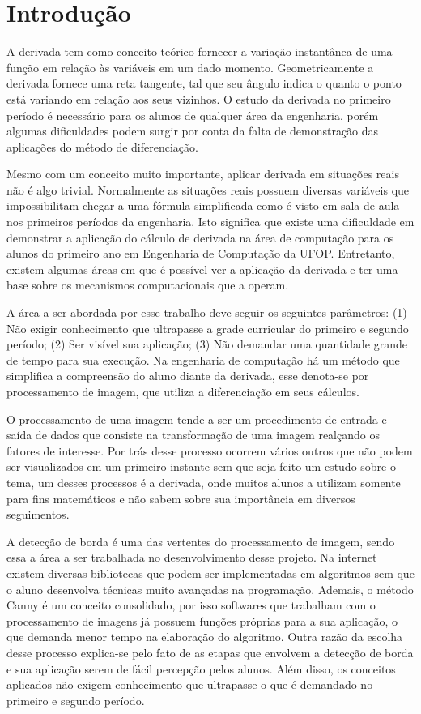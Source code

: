 \documentclass[12pt]{article}
\begin{document}
	
	\section{Introdução}
	
	A derivada tem como conceito teórico fornecer a variação instantânea de uma função em relação às variáveis em um dado momento. Geometricamente a derivada fornece uma reta tangente, tal que seu ângulo indica o quanto o ponto está variando em relação aos seus vizinhos. O estudo da derivada no primeiro período é necessário para os alunos de qualquer área da engenharia, porém algumas dificuldades podem surgir por conta da falta de demonstração das aplicações do método de diferenciação. 
	
	Mesmo com um conceito muito importante, aplicar derivada em situações reais não é algo trivial. Normalmente as situações reais possuem diversas variáveis que impossibilitam chegar a uma fórmula simplificada como é visto em sala de aula nos primeiros períodos da engenharia. Isto significa que existe uma dificuldade em demonstrar a aplicação do cálculo de derivada na área de computação para os alunos do primeiro ano em Engenharia de Computação da UFOP. Entretanto, existem algumas áreas em que é possível ver a aplicação da derivada e ter uma base sobre os mecanismos computacionais que a operam. 
	
	A área a ser abordada por esse trabalho deve seguir os seguintes parâmetros: (1) Não exigir conhecimento que ultrapasse a grade curricular do primeiro e segundo período; (2) Ser visível sua aplicação; (3) Não demandar uma quantidade grande de tempo para sua execução. Na engenharia de computação há um método que simplifica a compreensão do aluno diante da derivada, esse denota-se por processamento de imagem, que utiliza a diferenciação em seus cálculos.
	
	O processamento de uma imagem tende a ser um procedimento de entrada e saída de dados que consiste na transformação de uma imagem realçando os fatores de interesse. Por trás desse processo ocorrem vários outros que não podem ser visualizados em um primeiro instante sem que seja feito um estudo sobre o tema, um desses processos é a derivada, onde muitos alunos a utilizam somente para fins matemáticos e não sabem sobre sua importância em diversos seguimentos.
	
	A detecção de borda é uma das vertentes do processamento de imagem, sendo essa a área a ser trabalhada no desenvolvimento desse projeto. Na internet existem diversas bibliotecas que podem ser implementadas em algoritmos sem que o aluno desenvolva técnicas muito avançadas na programação. Ademais, o método Canny é um conceito consolidado, por isso softwares que trabalham com o processamento de imagens já possuem funções próprias para a sua aplicação, o que demanda menor tempo na elaboração do algoritmo. Outra razão da escolha desse processo explica-se pelo fato de as etapas que envolvem a detecção de borda e sua aplicação serem de fácil percepção pelos alunos. Além disso, os conceitos aplicados não exigem conhecimento que ultrapasse o que é demandado no primeiro e segundo período. 
	
\end{document}
